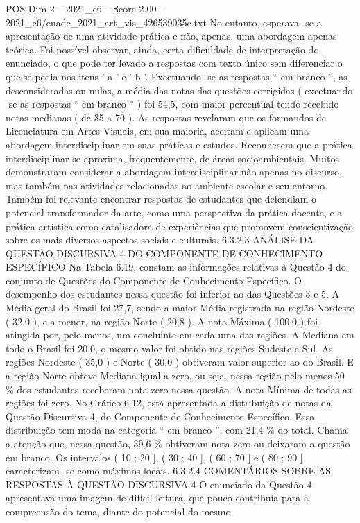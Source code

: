 \begin{textsample}{POS Dim 2 – 2021\_c6 – Score 2.00 – 2021\_c6/enade\_2021\_art\_vis\_426539035c.txt}
No entanto, esperava -se a apresentação de uma atividade prática e não, apenas, uma abordagem apenas teórica.
Foi possível observar, ainda, certa dificuldade de interpretação do enunciado, o que pode ter levado a respostas com texto único sem diferenciar o que se pedia nos itens ' a ' e ' b '.
Excetuando -se as respostas “ em branco ”, as desconsideradas ou nulas, a média das notas das questões corrigidas ( excetuando -se as respostas “ em branco ” ) foi 54,5, com maior percentual tendo recebido notas medianas ( de 35 a 70 ).
As respostas revelaram que os formandos de Licenciatura em Artes Visuais, em sua maioria, aceitam e aplicam uma abordagem interdisciplinar em suas práticas e estudos.
Reconhecem que a prática interdisciplinar se aproxima, frequentemente, de áreas socioambientais.
Muitos demonstraram considerar a abordagem interdisciplinar não apenas no discurso, mas também nas atividades relacionadas ao ambiente escolar e seu entorno.
Também foi relevante encontrar respostas de estudantes que defendiam o potencial transformador da arte, como uma perspectiva da prática docente, e a prática artística como catalisadora de experiências que promovem conscientização sobre os mais diversos aspectos sociais e culturais. 6.3.2.3 ANÁLISE DA QUESTÃO DISCURSIVA 4 DO COMPONENTE DE CONHECIMENTO ESPECÍFICO Na Tabela 6.19, constam as informações relativas à Questão 4 do conjunto de Questões do Componente de Conhecimento Específico.
O desempenho dos estudantes nessa questão foi inferior ao das Questões 3 e 5.
A Média geral do Brasil foi 27,7, sendo a maior Média registrada na região Nordeste ( 32,0 ), e a menor, na região Norte ( 20,8 ).
A nota Máxima ( 100,0 ) foi atingida por, pelo menos, um concluinte em cada uma das regiões.
A Mediana em todo o Brasil foi 20,0, o mesmo valor foi obtido nas regiões Sudeste e Sul.
As regiões Nordeste ( 35,0 ) e Norte ( 30,0 ) obtiveram valor superior ao do Brasil.
E a região Norte obteve Mediana igual a zero, ou seja, nessa região pelo menos 50 \% dos estudantes receberam nota zero nessa questão.
A nota Mínima de todas as regiões foi zero.
No Gráfico 6.12, está apresentada a distribuição de notas da Questão Discursiva 4, do Componente de Conhecimento Específico.
Essa distribuição tem moda na categoria “ em branco ”, com 21,4 \% do total.
Chama a atenção que, nessa questão, 39,6 \% obtiveram nota zero ou deixaram a questão em branco.
Os intervalos ( 10 ; 20 ], ( 30 ; 40 ], ( 60 ; 70 ] e ( 80 ; 90 ] caracterizam -se como máximos locais. 6.3.2.4 COMENTÁRIOS SOBRE AS RESPOSTAS À QUESTÃO DISCURSIVA 4 O enunciado da Questão 4 apresentava uma imagem de difícil leitura, que pouco contribuía para a compreensão do tema, diante do potencial do mesmo.

\end{textsample}
